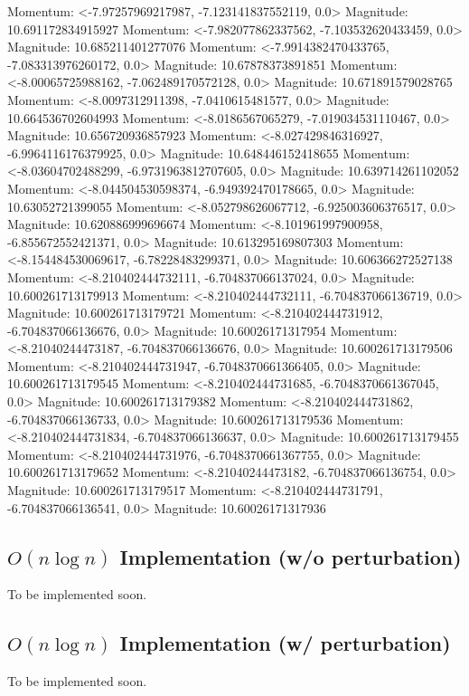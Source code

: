 \documentclass[10pt]{article}
\begin{document}
Momentum: <-7.97257969217987, -7.123141837552119, 0.0> Magnitude: 10.691172834915927
Momentum: <-7.982077862337562, -7.103532620433459, 0.0> Magnitude: 10.685211401277076
Momentum: <-7.9914382470433765, -7.083313976260172, 0.0> Magnitude: 10.67878373891851
Momentum: <-8.00065725988162, -7.062489170572128, 0.0> Magnitude: 10.671891579028765
Momentum: <-8.0097312911398, -7.0410615481577, 0.0> Magnitude: 10.664536702604993
Momentum: <-8.0186567065279, -7.019034531110467, 0.0> Magnitude: 10.656720936857923
Momentum: <-8.027429846316927, -6.9964116176379925, 0.0> Magnitude: 10.648446152418655
Momentum: <-8.03604702488299, -6.9731963812707605, 0.0> Magnitude: 10.639714261102052
Momentum: <-8.044504530598374, -6.949392470178665, 0.0> Magnitude: 10.63052721399055
Momentum: <-8.052798626067712, -6.925003606376517, 0.0> Magnitude: 10.620886999696674
Momentum: <-8.101961997900958, -6.855672552421371, 0.0> Magnitude: 10.613295169807303
Momentum: <-8.154484530069617, -6.78228483299371, 0.0> Magnitude: 10.606366272527138
Momentum: <-8.210402444732111, -6.704837066137024, 0.0> Magnitude: 10.600261713179913
Momentum: <-8.210402444732111, -6.704837066136719, 0.0> Magnitude: 10.600261713179721
Momentum: <-8.210402444731912, -6.704837066136676, 0.0> Magnitude: 10.60026171317954
Momentum: <-8.21040244473187, -6.704837066136676, 0.0> Magnitude: 10.600261713179506
Momentum: <-8.210402444731947, -6.7048370661366405, 0.0> Magnitude: 10.600261713179545
Momentum: <-8.210402444731685, -6.7048370661367045, 0.0> Magnitude: 10.600261713179382
Momentum: <-8.210402444731862, -6.704837066136733, 0.0> Magnitude: 10.600261713179536
Momentum: <-8.210402444731834, -6.704837066136637, 0.0> Magnitude: 10.600261713179455
Momentum: <-8.210402444731976, -6.7048370661367755, 0.0> Magnitude: 10.600261713179652
Momentum: <-8.21040244473182, -6.704837066136754, 0.0> Magnitude: 10.600261713179517
Momentum: <-8.210402444731791, -6.704837066136541, 0.0> Magnitude: 10.60026171317936

\subsection{$O(n \log n)$ Implementation (w/o perturbation)}
To be implemented soon.
\subsection{$O(n \log n)$ Implementation (w/ perturbation)}
To be implemented soon.
\end{document}
